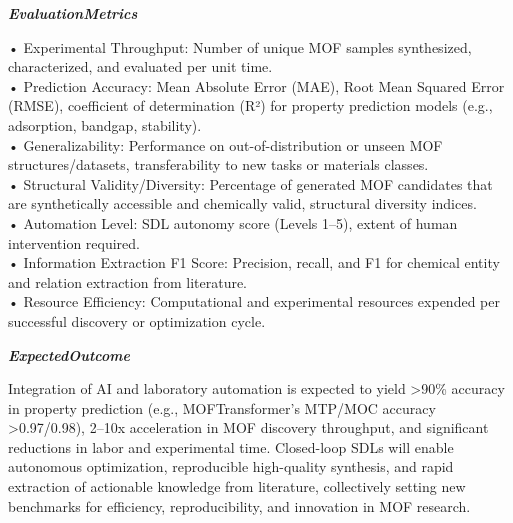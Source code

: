\begin{tcolorbox}[
    breakable,
    title={Example of Idea Generation in Material},
    colback=LighterGray,
    colframe=DeepPurple,
    colbacktitle=DeepPurple,
    coltitle=White,
]
\textbf{\emph{\textcolor{CaseOrange}{EvaluationMetrics}}}

• Experimental Throughput: Number of unique MOF samples synthesized, characterized, and evaluated per unit time. \\
• Prediction Accuracy: Mean Absolute Error (MAE), Root Mean Squared Error (RMSE), coefficient of determination (R²) for property prediction models (e.g., adsorption, bandgap, stability). \\
• Generalizability: Performance on out-of-distribution or unseen MOF structures/datasets, transferability to new tasks or materials classes. \\
• Structural Validity/Diversity: Percentage of generated MOF candidates that are synthetically accessible and chemically valid, structural diversity indices. \\
• Automation Level: SDL autonomy score (Levels 1–5), extent of human intervention required. \\
• Information Extraction F1 Score: Precision, recall, and F1 for chemical entity and relation extraction from literature. \\
• Resource Efficiency: Computational and experimental resources expended per successful discovery or optimization cycle. 

\textbf{\emph{\textcolor{CaseOrange}{ExpectedOutcome}}}

Integration of AI and laboratory automation is expected to yield >90\% accuracy in property
prediction (e.g., MOFTransformer's MTP/MOC accuracy >0.97/0.98), 2–10x acceleration in MOF discovery
throughput, and significant reductions in labor and experimental time. Closed-loop SDLs will enable
autonomous optimization, reproducible high-quality synthesis, and rapid extraction of actionable
knowledge from literature, collectively setting new benchmarks for efficiency, reproducibility, and
innovation in MOF research.

\end{tcolorbox}


